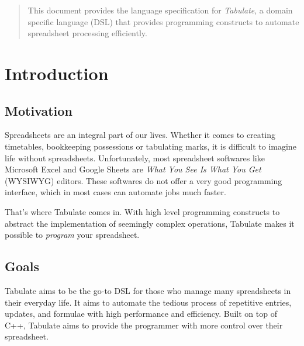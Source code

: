 \documentclass[conference,compsoc]{IEEEtran}
\begin{document}
\maketitle
\tableofcontents
\vspace{3mm}
\begin{abstract}
This document provides the language specification for \emph{Tabulate}, a domain
specific language (DSL) that provides programming constructs to automate
spreadsheet processing efficiently.  
\end{abstract}


%
\IEEEpeerreviewmaketitle

\section{Introduction}

\subsection{Motivation}
Spreadsheets are an integral part of our lives. Whether it comes to creating
timetables, bookkeeping possessions or tabulating marks, it is difficult to
imagine life without spreadsheets. Unfortunately, most spreadsheet softwares
like Microsoft Excel and Google Sheets are \emph{What You See Is What You Get}
(WYSIWYG) editors. These softwares do not offer a very good programming
interface, which in most cases can automate jobs much faster.

That's where Tabulate comes in. With high level programming constructs to
abstract the implementation of seemingly complex operations, Tabulate makes it
possible to \emph{program} your spreadsheet.

\subsection{Goals}
Tabulate aims to be the go-to DSL for those who manage many spreadsheets in
their everyday life. It aims to automate the tedious process of repetitive
entries, updates, and formulae with high performance and efficiency. Built on
top of C++, Tabulate aims to provide the programmer with more control over their
spreadsheet.
\end{document}
